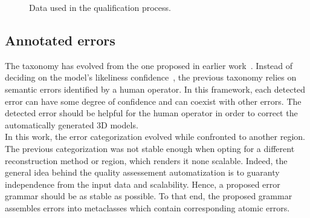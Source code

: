 \documentclass[../main.tex]{subfiles}
\begin{document}
    \begin{figure}[H]
        {
            \caption{\label{fig::dataset} Data used in the qualification process.}
        }
    \end{figure}

    \subsection{Annotated errors}

    The taxonomy has evolved from the one proposed in earlier work~\cite{michelin2013quality}. Instead of deciding on the model's likeliness confidence~\cite{Boudet2006}, the previous taxonomy relies on semantic errors identified by a human operator. In this framework, each detected error can have some degree of confidence and can coexist with other errors. The detected error should be helpful for the human operator in order to correct the automatically generated 3D models.\\

    In this work, the error categorization evolved while confronted to another region. The previous categorization was not stable enough when opting for a different reconstruction method or region, which renders it none scalable. Indeed, the general idea behind the quality assessement automatization is to guaranty independence from the input data and scalability. Hence, a proposed error grammar should be as stable as possible. To that end, the proposed grammar assembles errors into metaclasses which contain corresponding atomic errors.\\
\end{document}
